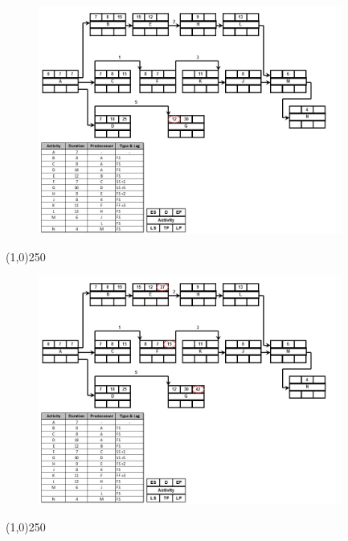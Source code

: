 \begin{frame}
\begin{figure}
	\centering
		\includegraphics[width = 10.0cm]{oldnotes/Slide206.jpg}
\end{figure}
\end{frame}
\begin{center}\line(1,0){250}\end{center}




\begin{frame}
\begin{figure}
	\centering
		\includegraphics[width = 10.0cm]{oldnotes/Slide207.jpg}
\end{figure}
\end{frame}
\begin{center}\line(1,0){250}\end{center}




